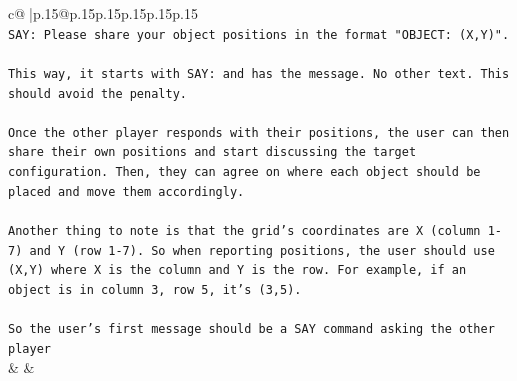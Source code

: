 \documentclass{article}
\begin{document}
{\begin{supertabular}{c@{$\;$}|p{.15\linewidth}@{}p{.15\linewidth}p{.15\linewidth}p{.15\linewidth}p{.15\linewidth}p{.15\linewidth}}
{{{\\ 
\texttt{SAY: Please share your object positions in the format "OBJECT: (X,Y)".} \\
\\ 
\texttt{This way, it starts with SAY: and has the message. No other text. This should avoid the penalty.} \\
\\ 
\texttt{Once the other player responds with their positions, the user can then share their own positions and start discussing the target configuration. Then, they can agree on where each object should be placed and move them accordingly.} \\
\\ 
\texttt{Another thing to note is that the grid's coordinates are X (column 1{-}7) and Y (row 1{-}7). So when reporting positions, the user should use (X,Y) where X is the column and Y is the row. For example, if an object is in column 3, row 5, it's (3,5).} \\
\\ 
\texttt{So the user's first message should be a SAY command asking the other player} \\
            }
        }
    }
    & & \\ \\


\end{supertabular}}
\end{document}
